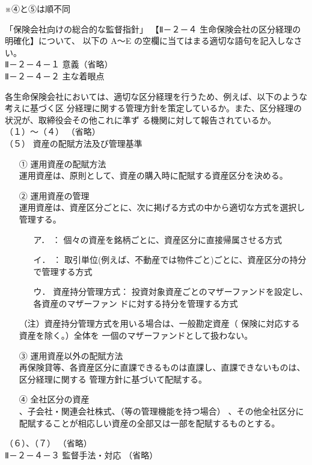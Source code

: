 \documentclass[report,gutter=10mm,fore-edge=10mm,uplatex,dvipdfmx]{jlreq}
\begin{document}
※④と⑤は順不同

「保険会社向けの総合的な監督指針」
【Ⅱ－２－４ 生命保険会社の区分経理の明確化】について、
以下の A～E の空欄に当てはまる適切な語句を記入しなさい。\\
\vspace{1zh}
\noindent Ⅱ－２－４－１ 意義（省略）\\
Ⅱ－２－４－２ 主な着眼点

各生命保険会社においては、適切な区分経理を行うため、例えば、以下のような考えに基づく区
分経理に関する管理方針を策定しているか。また、区分経理の状況が、取締役会その他これに準ず
る機関に対して報告されているか。\\
（１）～（４） （省略）\\
（５） 資産の配賦方法及び管理基準
\begin{itemize}
\item[①] 運用資産の配賦方法\\
 運用資産は、原則として、資産の購入時に配賦する資産区分を決める。
\item[②] 運用資産の管理\\
 運用資産は、資産区分ごとに、次に掲げる方式の中から適切な方式を選択し管理する。

\begin{itemize}
\item[ ア．] ： 個々の資産を銘柄ごとに、資産区分に直接帰属させる方式
\item[ イ．] ： 取引単位(例えば、不動産では物件ごと)ごとに、資産区分の持分で管理する方式
\item[ ウ．] 資産持分管理方式： 投資対象資産ごとのマザーファンドを設定し、各資産のマザーファン
 ドに対する持分を管理する方式
\end{itemize} 
（注）資産持分管理方式を用いる場合は、一般勘定資産（ 保険に対応する資産を除く。）全体を 一個のマザーファンドとして扱わない。
\item[③] 運用資産以外の配賦方法\\
 再保険貸等、各資産区分に直課できるものは直課し、直課できないものは、区分経理に関する
 管理方針に基づいて配賦する。
\item[④] 全社区分の資産\\
 、子会社・関連会社株式、（等の管理機能を持つ場合）
 、その他全社区分に配賦することが相応しい資産の全部又は一部を配賦するものとする。
\end{itemize}
\noindent （６）、（７） （省略）\\
Ⅱ－２－４－３ 監督手法・対応 （省略）
\end{document}
